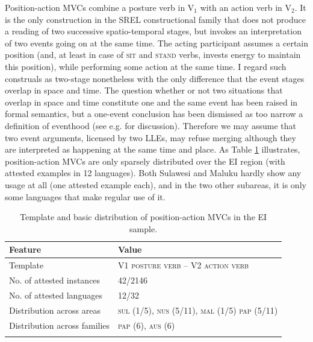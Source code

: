 Position-action MVCs combine a posture verb in V$_1$ with an action verb in V$_2$. It is the only construction in the SREL constructional family that does not produce a reading of two successive spatio-temporal stages, but invokes an interpretation of two events going on at the same time. The acting participant assumes a certain position (and, at least in case of \textsc{sit} and \textsc{stand} verbs, invests energy to maintain this position), while performing some action at the same time. I regard such construals as two-stage nonetheless with the only difference that the event stages overlap in space and time. The question whether or not two situations that overlap in space and time constitute one and the same event has been raised in formal semantics, but a one-event conclusion has been dismissed as too narrow a definition of eventhood (see e.g. \citealt{maienborn2005limits} for discussion). Therefore we may assume that two event arguments, licensed by two LLEs, may refuse merging although they are interpreted as happening at the same time and place. As Table \ref{table:position-action} illustrates, position-action MVCs are only sparsely distributed over the EI region (with attested examples in 12 languages). Both Sulawesi and Maluku hardly show any usage at all (one attested example each), and in the two other subareas, it is only some languages that make regular use of it.

\begin{table}
\begin{tabular}{ll}
\lsptoprule
Feature&Value\tabularnewline
\midrule
Template&V1 \textsc{posture verb} -- V2 \textsc{action verb}\tabularnewline
No. of attested instances& 42/2146 \tabularnewline
No. of attested languages& 12/32 \tabularnewline
Distribution across areas& \textsc{sul} (1/5), \textsc{nus} (5/11), \textsc{mal} (1/5) \textsc{pap} (5/11) \tabularnewline
Distribution across families& \textsc{pap} (6), \textsc{aus} (6) \tabularnewline
\lspbottomrule
\end{tabular}
\caption[Template and basic distribution of position-action MVCs]{Template and basic distribution of position-action MVCs in the EI sample.}
\label{table:position-action}
\end{table}

